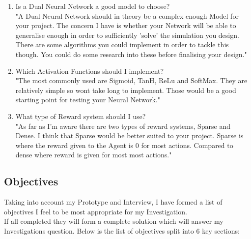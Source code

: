 \begin{flushleft}
\begin{enumerate}
                \item Is a Dual Neural Network a good model to choose? \\
                    \vspace{0.2cm}
                    "A Dual Neural Network should in theory be a complex enough Model for your project. The concern I have is whether your
                    Network will be able to generalise enough in order to sufficiently 'solve' the simulation you design. There are some
                    algorithms you could implement in order to tackle this though. You could do some research into these before finalising 
                    your design."

                \item Which Activation Functions should I implement? \\
                    \vspace{0.2cm}
                    "The most commonly used are Sigmoid, TanH, ReLu and SoftMax. They are relatively simple so wont take long to implement.
                    Those would be a good starting point for testing your Neural Network."
                
                \item What type of Reward system should I use? \\
                    \vspace{0.2cm}
                    "As far as I'm aware there are two types of reward systems, Sparse and Dense. I think that Sparse would be better suited
                    to your project. Sparse is where the reward given to the Agent is 0 for most actions. Compared to dense where reward
                    is given for most most actions."
            \end{enumerate}

            \pagebreak
        \subsection{Objectives}
            \large
            Taking into account my Prototype and Interview, I have formed a list of objectives I feel to be most 
            appropriate for my Investigation.\\
            \vspace{0.2cm}
            If all completed they will form a complete solution which will answer my Investigations question.
            Below is the list of objectives split into 6 key sections:


\end{flushleft}

